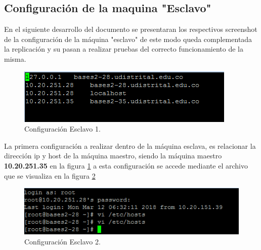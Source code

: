 \subsection*{Configuración de la maquina "Esclavo"}

En el siguiente desarrollo del documento se presentaran los respectivos screenshot de la configuración de la máquina "esclavo" de este modo queda complementada la replicación y su pasan a realizar pruebas del correcto funcionamiento de la misma.

\begin{figure}[H]
\centering
\includegraphics[width=\columnwidth]{eRelatedWorks/src/Captura1}
\caption{Configuración Esclavo 1. }\label{figC:1}
\end{figure}

La primera configuración a realizar dentro de la máquina esclava, es relacionar la dirección ip y host de la máquina maestro, siendo la máquina maestro \textbf{10.20.251.35} en la figura \ref{figC:1} a esta configuración se accede mediante el archivo que se visualiza en la figura \ref{figC:2}

\begin{figure}[H]
\centering
\includegraphics[width=\columnwidth]{eRelatedWorks/src/Captura2}
\caption{Configuración Esclavo 2. }\label{figC:2}
\end{figure}

